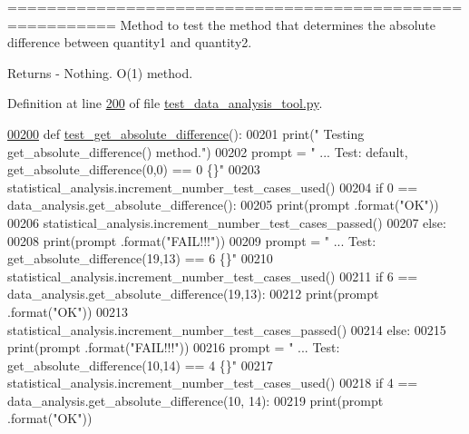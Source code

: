 ========================================================= Method to test the method that determines the absolute difference between quantity1 and quantity2. 

\begin{DoxyReturn}{Returns}
-\/ Nothing. O(1) method. 
\end{DoxyReturn}


Definition at line \hyperlink{test__data__analysis__tool_8py_source_l00200}{200} of file \hyperlink{test__data__analysis__tool_8py_source}{test\+\_\+data\+\_\+analysis\+\_\+tool.\+py}.


\begin{DoxyCode}
\hypertarget{classstatistics_1_1test__data__analysis__tool_1_1data__analysis__tester_l00200}{}\hyperlink{classstatistics_1_1test__data__analysis__tool_1_1data__analysis__tester_a3b1f6f4fd16ef986ead81484c80fc164}{00200}     \textcolor{keyword}{def }\hyperlink{classstatistics_1_1test__data__analysis__tool_1_1data__analysis__tester_a3b1f6f4fd16ef986ead81484c80fc164}{test\_get\_absolute\_difference}():
00201         print(\textcolor{stringliteral}{" Testing get\_absolute\_difference() method."})
00202         prompt = \textcolor{stringliteral}{"  ... Test: default, get\_absolute\_difference(0,0) == 0    \{\}"}
00203         statistical\_analysis.increment\_number\_test\_cases\_used()
00204         \textcolor{keywordflow}{if} 0 == data\_analysis.get\_absolute\_difference():
00205             print(prompt .format(\textcolor{stringliteral}{"OK"}))
00206             statistical\_analysis.increment\_number\_test\_cases\_passed()
00207         \textcolor{keywordflow}{else}:
00208             print(prompt .format(\textcolor{stringliteral}{"FAIL!!!"}))
00209         prompt = \textcolor{stringliteral}{"  ... Test: get\_absolute\_difference(19,13) == 6       \{\}"}
00210         statistical\_analysis.increment\_number\_test\_cases\_used()
00211         \textcolor{keywordflow}{if} 6 == data\_analysis.get\_absolute\_difference(19,13):
00212             print(prompt .format(\textcolor{stringliteral}{"OK"}))
00213             statistical\_analysis.increment\_number\_test\_cases\_passed()
00214         \textcolor{keywordflow}{else}:
00215             print(prompt .format(\textcolor{stringliteral}{"FAIL!!!"}))
00216         prompt = \textcolor{stringliteral}{"  ... Test: get\_absolute\_difference(10,14) == 4       \{\}"}
00217         statistical\_analysis.increment\_number\_test\_cases\_used()
00218         \textcolor{keywordflow}{if} 4 == data\_analysis.get\_absolute\_difference(10, 14):
00219             print(prompt .format(\textcolor{stringliteral}{"OK"}))

\end{DoxyCode}
